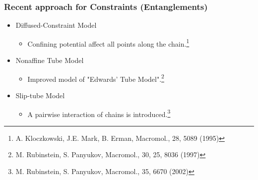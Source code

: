 \documentclass[12pt, dvipdfmx]{beamer}
\begin{document}
\setcounter{footnote}{0}
\begin{frame}
	\frametitle{Recent approach for Constraints (Entanglements)}
	\vspace{-2mm}
		\begin{itemize}
			\item Diffused-Constraint Model
			\begin{itemize}
				\item Confining potential affect all points along the chain.\footnote{\tiny{A. Kloczkowski, J.E. Mark, B. Erman, Macromol., 28, 5089 (1995)}}
			\end{itemize}
			\item Nonaffine Tube Model
			\begin{itemize}
				\item Improved model of "Edwards' Tube Model".\footnote{\tiny{M. Rubinstein, S. Panyukov, Macromol., 30, 25, 8036 (1997)}}
			\end{itemize}
			\item \alert<2>{Slip-tube Model}
			\begin{itemize}
				\item A pairwise interaction of chains is introduced.\footnote{\tiny{M. Rubinstein, S. Panyukov, Macromol., 35, 6670 (2002)}}
			\end{itemize}
		\end{itemize}

		\vspace{1mm}
		\centering
\end{frame}
\end{document}
